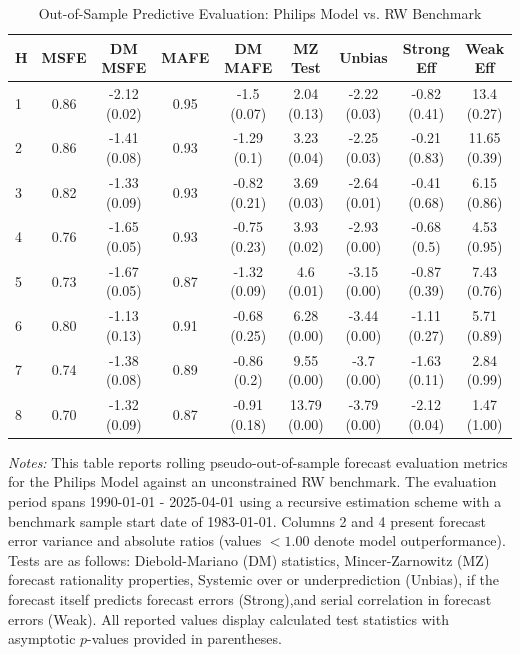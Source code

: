 \begin{table}[htbp]
\centering
\caption{Out-of-Sample Predictive Evaluation: Philips Model vs. RW Benchmark}
\label{tab:philips_model_evaluation}
\footnotesize
\begin{tabular}{l cccccccc}
\hline\hline
\rule{0pt}{3ex}
\textbf{H} & \textbf{MSFE} & \textbf{DM MSFE} & \textbf{MAFE} & \textbf{DM MAFE} & \textbf{MZ Test} & \textbf{Unbias} & \textbf{Strong Eff} & \textbf{Weak Eff} \\[0.5ex]
\hline
\rule{0pt}{2.5ex}
1 & 0.86 & -2.12 (0.02) & 0.95 & -1.5 (0.07) & 2.04 (0.13) & -2.22 (0.03) & -0.82 (0.41) & 13.4 (0.27) \\
2 & 0.86 & -1.41 (0.08) & 0.93 & -1.29 (0.1) & 3.23 (0.04) & -2.25 (0.03) & -0.21 (0.83) & 11.65 (0.39) \\
3 & 0.82 & -1.33 (0.09) & 0.93 & -0.82 (0.21) & 3.69 (0.03) & -2.64 (0.01) & -0.41 (0.68) & 6.15 (0.86) \\
4 & 0.76 & -1.65 (0.05) & 0.93 & -0.75 (0.23) & 3.93 (0.02) & -2.93 (0.00) & -0.68 (0.5) & 4.53 (0.95) \\
5 & 0.73 & -1.67 (0.05) & 0.87 & -1.32 (0.09) & 4.6 (0.01) & -3.15 (0.00) & -0.87 (0.39) & 7.43 (0.76) \\
6 & 0.80 & -1.13 (0.13) & 0.91 & -0.68 (0.25) & 6.28 (0.00) & -3.44 (0.00) & -1.11 (0.27) & 5.71 (0.89) \\
7 & 0.74 & -1.38 (0.08) & 0.89 & -0.86 (0.2) & 9.55 (0.00) & -3.7 (0.00) & -1.63 (0.11) & 2.84 (0.99) \\
8 & 0.70 & -1.32 (0.09) & 0.87 & -0.91 (0.18) & 13.79 (0.00) & -3.79 (0.00) & -2.12 (0.04) & 1.47 (1.00) \\
\hline\hline
\end{tabular}%
\par\smallskip
\parbox{\textwidth}{\scriptsize \textit{Notes:} This table reports rolling pseudo-out-of-sample forecast evaluation metrics for the Philips Model against an unconstrained RW benchmark. The evaluation period spans 1990-01-01 - 2025-04-01 using a recursive estimation scheme with a benchmark sample start date of 1983-01-01. Columns 2 and 4 present forecast error variance and absolute ratios (values $< 1.00$ denote model outperformance). Tests are as follows: Diebold-Mariano (DM) statistics, Mincer-Zarnowitz (MZ) forecast rationality properties, Systemic over or underprediction (Unbias), if the forecast itself predicts forecast errors (Strong),and serial correlation in forecast errors (Weak). All reported values display calculated test statistics with asymptotic $p$-values provided in parentheses.}
\end{table}
